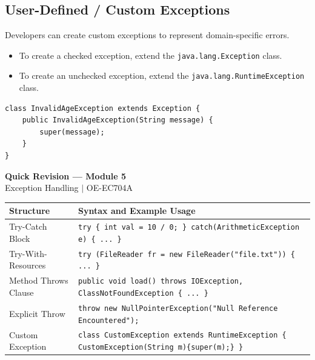 \documentclass[12pt,a4paper]{article}
\renewcommand{\arraystretch}{1.45}
\begin{document}
\subsection{User-Defined / Custom Exceptions}
Developers can create custom exceptions to represent domain-specific errors.
\begin{itemize}[leftmargin=*, itemsep=3pt]
  \item To create a checked exception, extend the \texttt{java.lang.Exception} class.
  \item To create an unchecked exception, extend the \texttt{java.lang.RuntimeException} class.
\end{itemize}
\begin{verbatim}
class InvalidAgeException extends Exception {
    public InvalidAgeException(String message) {
        super(message);
    }
}
\end{verbatim}

\newpage
\begin{center}
  {\large\bfseries\color{myred} Quick Revision --- Module 5}\\[3pt]
  {\small\color{mydark} Exception Handling $|$ OE-EC704A}
\end{center}
\noindent{\color{myred}\rule{\linewidth}{1.2pt}}
\vspace{4pt}

\begin{tcolorbox}[formulabox, title={\textbf{Exception Handling Code Constructs}}]
{\renewcommand{\arraystretch}{1.3}%
\begin{tabularx}{\linewidth}{l Y}
\textbf{Structure} & \textbf{Syntax and Example Usage} \\
\hline
Try-Catch Block & \texttt{try \{ int val = 10 / 0; \} catch(ArithmeticException e) \{ ... \}} \\
Try-With-Resources & \texttt{try (FileReader fr = new FileReader("file.txt")) \{ ... \}} \\
Method Throws Clause & \texttt{public void load() throws IOException, ClassNotFoundException \{ ... \}} \\
Explicit Throw & \texttt{throw new NullPointerException("Null Reference Encountered");} \\
Custom Exception & \texttt{class CustomException extends RuntimeException \{ CustomException(String m)\{super(m);\} \}} \\
\end{tabularx}}
\end{tcolorbox}
\end{document}
